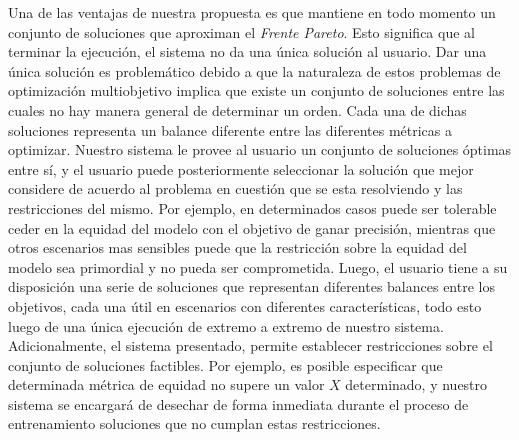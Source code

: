 Una de las ventajas de nuestra propuesta es que mantiene en todo momento un conjunto de soluciones que aproximan el \emph{Frente Pareto}.
Esto significa que al terminar la ejecución, el sistema no da una única solución al usuario.
Dar una única solución es problemático debido a que la naturaleza de estos problemas de optimización multiobjetivo implica que existe un conjunto de soluciones entre las cuales no hay manera general de determinar un orden.
Cada una de dichas soluciones representa un balance diferente entre las diferentes métricas a optimizar.
Nuestro sistema le provee al usuario un conjunto de soluciones óptimas entre sí, y el usuario puede posteriormente seleccionar la solución que mejor considere de acuerdo al problema en cuestión que se esta resolviendo y las restricciones del mismo.
Por ejemplo, en determinados casos puede ser tolerable ceder en la equidad del modelo con el objetivo de ganar precisión, mientras que otros escenarios mas sensibles puede que la restricción sobre la equidad del modelo sea primordial y no pueda ser comprometida.
Luego, el usuario tiene a su disposición una serie de soluciones que representan diferentes balances entre los objetivos, cada una útil en escenarios con diferentes características, todo esto luego de una única ejecución de extremo a extremo de nuestro sistema.
Adicionalmente, el sistema presentado, permite establecer restricciones sobre el conjunto de soluciones factibles.
Por ejemplo, es posible especificar que determinada métrica de equidad no supere un valor $X$ determinado, y nuestro sistema se encargará de desechar de forma inmediata durante el proceso de entrenamiento soluciones que no cumplan estas restricciones.